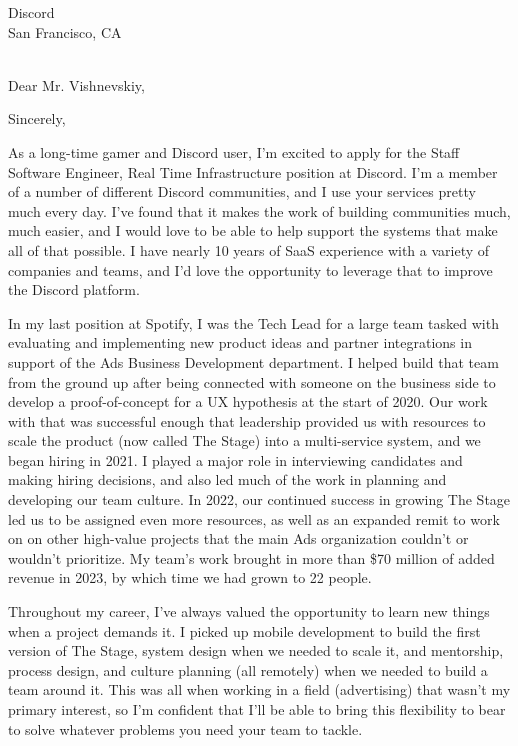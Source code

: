 

{Discord
	\\San Francisco, CA}

\date{June 14, 2024}
\opening{\\Dear Mr. Vishnevskiy,}
\closing{Sincerely,}
\makelettertitle


As a long-time gamer and Discord user, I'm excited to apply for the Staff Software Engineer, Real Time Infrastructure position at Discord.
I'm a member of a number of different Discord communities, and I use your services pretty much every day. I've found that it makes the
work of building communities much, much easier, and I would love to be able to help support the systems that make all of that possible.
I have nearly 10 years of SaaS experience with a variety of companies and teams,
and I'd love the opportunity to leverage that to improve the Discord platform.

In my last position at Spotify, I was the Tech Lead for a large team tasked with evaluating and implementing new product ideas
and partner integrations in support of the Ads Business Development department.
I helped build that team from the ground up after being connected with someone on the business side to develop a proof-of-concept
for a UX hypothesis at the start of 2020. Our work with that was successful enough that leadership provided us with resources
to scale the product (now called The Stage) into a multi-service system, and we began hiring in 2021.
I played a major role in interviewing candidates and making hiring decisions,
and also led much of the work in planning and developing our team culture.
In 2022, our continued success in growing The Stage led us to be assigned even more resources,
as well as an expanded remit to work on on other high-value projects that the main Ads organization couldn't or wouldn't prioritize.
My team's work brought in more than \$70 million of added revenue in 2023, by which time we had grown to 22 people.

Throughout my career, I've always valued the opportunity to learn new things when a project demands it.
I picked up mobile development to build the first version of The Stage, system design when we needed to scale it,
and mentorship, process design, and culture planning (all remotely) when we needed to build a team around it.
This was all when working in a field (advertising) that wasn't my primary interest,
so I'm confident that I'll be able to bring this flexibility to bear to solve whatever problems
you need your team to tackle.

